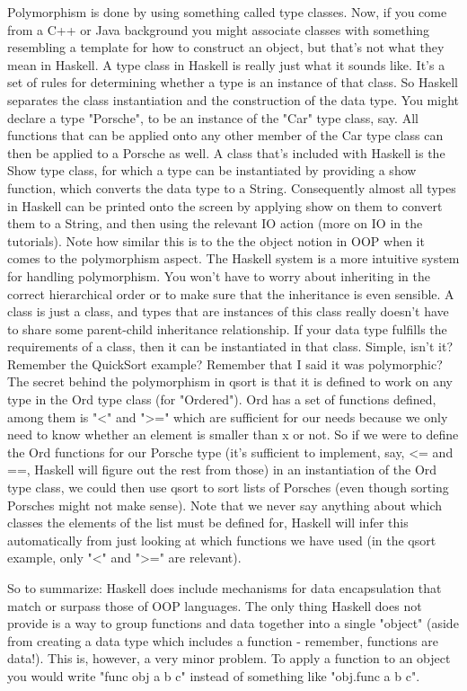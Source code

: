 \documentclass{report}
\begin{document}
Polymorphism is done by using something called type classes. Now, if you come from a C++ or Java background you might associate classes with something resembling a template for how to construct an object, but that's not what they mean in Haskell. A type class in Haskell is really just what it sounds like. It's a set of rules for determining whether a type is an instance of that class. So Haskell separates the class instantiation and the construction of the data type. You might declare a type "Porsche", to be an instance of the "Car" type class, say. All functions that can be applied onto any other member of the Car type class can then be applied to a Porsche as well. A class that's included with Haskell is the Show type class, for which a type can be instantiated by providing a show function, which converts the data type to a String. Consequently almost all types in Haskell can be printed onto the screen by applying show on them to convert them to a String, and then using the relevant IO action (more on IO in the tutorials). Note how similar this is to the the object notion in OOP when it comes to the polymorphism aspect. The Haskell system is a more intuitive system for handling polymorphism. You won't have to worry about inheriting in the correct hierarchical order or to make sure that the inheritance is even sensible. A class is just a class, and types that are instances of this class really doesn't have to share some parent-child inheritance relationship. If your data type fulfills the requirements of a class, then it can be instantiated in that class. Simple, isn't it? Remember the QuickSort example? Remember that I said it was polymorphic? The secret behind the polymorphism in qsort is that it is defined to work on any type in the Ord type class (for "Ordered"). Ord has a set of functions defined, among them is "<" and ">=" which are sufficient for our needs because we only need to know whether an element is smaller than x or not. So if we were to define the Ord functions for our Porsche type (it's sufficient to implement, say, <= and ==, Haskell will figure out the rest from those) in an instantiation of the Ord type class, we could then use qsort to sort lists of Porsches (even though sorting Porsches might not make sense). Note that we never say anything about which classes the elements of the list must be defined for, Haskell will infer this automatically from just looking at which functions we have used (in the qsort example, only "<" and ">=" are relevant).

So to summarize: Haskell does include mechanisms for data encapsulation that match or surpass those of OOP languages. The only thing Haskell does not provide is a way to group functions and data together into a single "object" (aside from creating a data type which includes a function - remember, functions are data!). This is, however, a very minor problem. To apply a function to an object you would write "func obj a b c" instead of something like "obj.func a b c".
\end{document}
